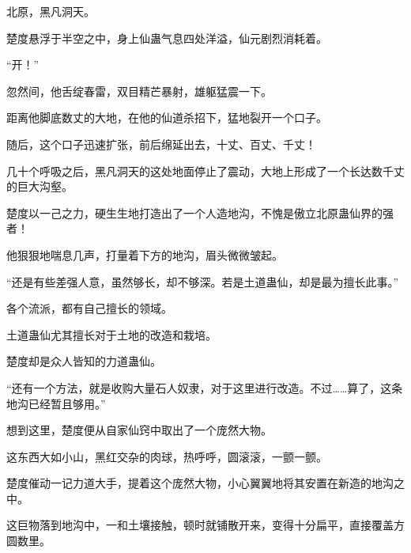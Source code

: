
\begin{this_body}

北原，黑凡洞天。

楚度悬浮于半空之中，身上仙蛊气息四处洋溢，仙元剧烈消耗着。

“开！”

忽然间，他舌绽春雷，双目精芒暴射，雄躯猛震一下。

距离他脚底数丈的大地，在他的仙道杀招下，猛地裂开一个口子。

随后，这个口子迅速扩张，前后绵延出去，十丈、百丈、千丈！

几十个呼吸之后，黑凡洞天的这处地面停止了震动，大地上形成了一个长达数千丈的巨大沟壑。

楚度以一己之力，硬生生地打造出了一个人造地沟，不愧是傲立北原蛊仙界的强者！

他狠狠地喘息几声，打量着下方的地沟，眉头微微皱起。

“还是有些差强人意，虽然够长，却不够深。若是土道蛊仙，却是最为擅长此事。”

各个流派，都有自己擅长的领域。

土道蛊仙尤其擅长对于土地的改造和栽培。

楚度却是众人皆知的力道蛊仙。

“还有一个方法，就是收购大量石人奴隶，对于这里进行改造。不过……算了，这条地沟已经暂且够用。”

想到这里，楚度便从自家仙窍中取出了一个庞然大物。

这东西大如小山，黑红交杂的肉球，热呼呼，圆滚滚，一颤一颤。

楚度催动一记力道大手，提着这个庞然大物，小心翼翼地将其安置在新造的地沟之中。

这巨物落到地沟中，一和土壤接触，顿时就铺散开来，变得十分扁平，直接覆盖方圆数里。

并且，颜色也发生变化。

起先。只是黑红两色，铺散开来之后，它汲取地气。通体颜色不断发生变化。这一块蓝，那一块绿。这边青葱如玉，那边赤红似火。

楚度从高处俯瞰，便见地沟这处，仿佛是铺上了一层色彩不断变化，十分绚烂多姿的地毯。

这就是斑斓胆！

七转仙材，来源于地沟极深之处。

楚度如法炮制，接下来，又从自家仙窍中取出了数十颗斑斓胆。一一放置下去。


\end{this_body}
